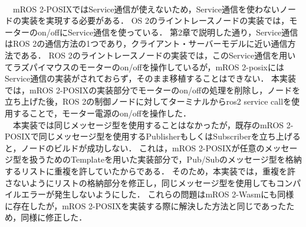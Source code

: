 \\　mROS 2-POSIXではService通信が使えないため，Service通信を使わないノードの実装を実現する必要がある．
OS 2のライントレースノードの実装では，モーターのon/offにService通信を使っている．
第2章で説明した通り，Service通信はROS 2の通信方法の1つであり，クライアント・サーバーモデルに近い通信方法である．
ROS 2のライントレースノードの実装では，このService通信を用いてラズパイマウスのモーターのon/offを操作しているが，mROS 2-posixにはService通信の実装がされておらず，そのまま移植することはできない．
本実装では，mROS 2-POSIXの実装部分でモーターのon/offの処理を削除し，ノードを立ち上げた後，ROS 2の制御ノードに対してターミナルからros2 service callを使用することで，モーター電源のon/offを操作した．
\\　本実装では同じメッセージ型を使用することはなかったが，既存のmROS 2-POSIXで同じメッセージ型を使用するPublisherもしくはSubscriberを立ち上げると，ノードのビルドが成功しない．
これは，mROS 2-POSIXが任意のメッセージ型を扱うためのTemplateを用いた実装部分で，Pub/Subのメッセージ型を格納するリストに重複を許していたからである．
そのため，本実装では，重複を許さないようにリストの格納部分を修正し，同じメッセージ型を使用してもコンパイルエラーが発生しないようにした．
これらの問題はmROS 2-Wasmにも同様に存在したが，mROS 2-POSIXを実装する際に解決した方法と同じであったため，同様に修正した．

